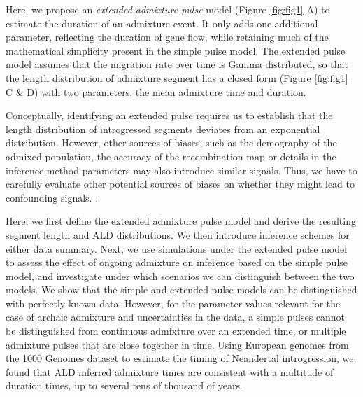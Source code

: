 \documentclass[11pt]{article}
\begin{document}
Here, we propose an \emph{extended admixture pulse} model (Figure \ref{fig:fig1} A) to estimate the duration of an admixture event. It only adds one additional parameter, reflecting the duration of gene flow, while retaining much of the mathematical simplicity present in the simple pulse model. 
The extended pulse model assumes that the migration rate over time is Gamma distributed, so that the length distribution of admixture segment has a closed form (Figure \ref{fig:fig1} C \& D) with two parameters, the mean admixture time and duration.

Conceptually, identifying an extended pulse requires us to establish that the length distribution of introgressed segments deviates from an exponential distribution. However, other sources of biases, such as the demography of the admixed population, the accuracy of the recombination map or details in the inference method parameters may also introduce similar signals. Thus, we have to carefully evaluate other potential sources of biases on whether they might lead to confounding signals. \citep{sankararaman_date_2012,fu_genome_2014,moorjani_genetic_2016}. 



Here, we first define the extended admixture pulse model and derive the resulting segment length and ALD distributions. We then introduce inference schemes for either data summary. Next, we use simulations under the extended pulse model to assess the effect of ongoing admixture on inference based on the simple pulse model, and investigate under which scenarios we can distinguish between the two models. We show that the simple and extended pulse models can be distinguished with perfectly known data. However, for the parameter values relevant for the  case of archaic admixture and uncertainties in the data, a simple pulses cannot be distinguished from continuous admixture  over an extended time, or multiple admixture pulses that are close together in time. Using European genomes from the 1000 Genomes dataset \citep{the_1000_genomes_project_consortium_global_2015} to estimate the timing of Neandertal introgression, we found that ALD inferred admixture times are consistent with a multitude of duration times, up to several tens of thousand of years.
\end{document}
